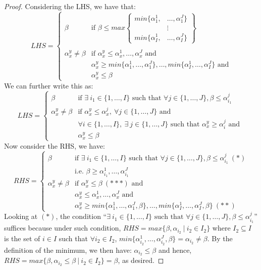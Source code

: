 \documentclass{article} %
\begin{document}
\begin{proof}
Considering the LHS, we have that:
\[
LHS=
\begin{cases}
\beta & \textrm{if } \beta\leq
max\left\{
      \begin{aligned}
        min\{\alpha_1^1,&\ldots,\alpha_1^J\} \\
        &\vdots \\
        min\{\alpha_I^1,&\ldots,\alpha_I^J\}
      \end{aligned}
    \right\} \\
    \\
\alpha_x^y\not=\beta &\textrm {if } \alpha_x^y\leq\alpha_x^1,\ldots,\alpha_x^J \textrm{ and} \\
& \alpha_x^y\geq min\{\alpha_1^1,\ldots,\alpha_1^J\},\ldots,min\{\alpha_I^1,\ldots,\alpha_I^J\} \textrm { and}\\
& \alpha_x^y\leq \beta
\end{cases}
\]
We can further write this as:
\[
LHS=
\begin{cases}
\beta & \textrm{if }\exists\ i_1\in\{1,\ldots,I\} \textrm{ such that }\forall j\in\{1,\ldots,J\}, \beta\leq\alpha_{i_1}^j \\
\alpha_x^y\not=\beta & \textrm{if } \alpha_x^y\leq\alpha_x^j,\ \forall j\in\{1,\ldots,J\} \textrm{ and} \\
& \forall i\in\{1,\ldots,I\},\ \exists\ j\in\{1,\ldots,J\} \textrm{ such that } \alpha_x^y\geq\alpha_i^j \textrm{ and } \\
& \alpha_x^y\leq \beta
\end{cases}
\]
Now consider the RHS, we have:
\[
RHS = 
\begin{cases}
\beta & \textrm{if }\exists\ i_1\in\{1,\ldots,I\} \textrm{ such that }\forall j\in\{1,\ldots,J\}, \beta\leq\alpha_{i_1}^j\ (*) \\
& \textrm{i.e. } \beta\geq\alpha_{i_1}^1,\ldots,\alpha_{i_1}^J\\
\alpha_x^y\not=\beta &\textrm{if }\alpha_x^y\leq\beta\ (***) \textrm{ and}\\
& \alpha_x^y\leq\alpha_x^1,\ldots,\alpha_x^J \textrm{ and}\\
& \alpha_x^y\geq min\{\alpha_1^1,\ldots,\alpha_1^J,\beta\},\ldots,min\{\alpha_I^1,\ldots,\alpha_I^J,\beta\}\ (**)
\end{cases}
\]
Looking at $(*)$, the condition ``$\exists\ i_1\in\{1,\ldots,I\} \textrm{ such that }\forall j\in\{1,\ldots,J\}, \beta\leq\alpha_{i_1}^j$'' suffices because under such condition, $RHS=max\{\beta, \alpha_{i_2}\ |\ i_2\in I_2\}$ where $I_2\subseteq I$ is the set of $i\in I$ such that $\forall i_2\in I_2$, $min\{\alpha_{i_2}^1,\ldots,\alpha_{i_2}^J,\beta\}=\alpha_{i_2}\not=\beta$. By the definition of the minimum, we then have: $\alpha_{i_2}\leq\beta$ and hence, $RHS=max\{\beta, \alpha_{i_2}\leq\beta\ |\ i_2\in I_2\}=\beta$, as desired.


\end{proof}
\end{document}
